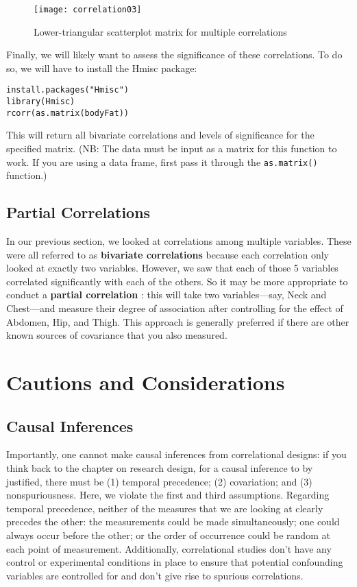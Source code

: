 \begin{figure}[htp]
	\texttt{[image: correlation03]}
	\caption{Lower-triangular scatterplot matrix for multiple correlations}
	\label{fig:correlation03}
\end{figure}

Finally, we will likely want to assess the significance of these correlations. To do so, we will have to install the Hmisc package:

\begin{framed}
\begin{Verbatim}[samepage=TRUE]
install.packages("Hmisc")
library(Hmisc)
rcorr(as.matrix(bodyFat))
\end{Verbatim}
\end{framed}

This will return all bivariate correlations  and levels of significance for the specified matrix. (NB: The data must be input as a matrix for this function to work. If you are using a data frame, first pass it through the \verb|as.matrix()| function.)

\subsection{Partial Correlations}
In our previous section, we looked at correlations among multiple variables. These were all referred to as \textbf{bivariate correlations} because each correlation only looked at exactly two variables. However, we saw that each of those 5 variables correlated significantly with each of the others. So it may be more appropriate to conduct a \textbf{partial correlation} : this will take two variables---say, Neck and Chest---and measure their degree of association after controlling for the effect of Abdomen, Hip, and Thigh. This approach is generally preferred if there are other known sources of covariance that you also measured.

\section{Cautions and Considerations}
\subsection{Causal Inferences}
Importantly, one cannot make causal inferences from correlational designs: if you think back to the chapter on research design, for a causal inference to by justified, there must be (1) temporal precedence; (2) covariation; and (3) nonspuriousness. Here, we violate the first and third assumptions. Regarding temporal precedence, neither of the measures that we are looking at clearly precedes the other: the measurements could be made simultaneously; one could always occur before the other; or the order of occurrence could be random at each point of measurement. Additionally, correlational studies don't have any control or experimental conditions in place to ensure that potential confounding variables are controlled for and don't give rise to spurious correlations.

